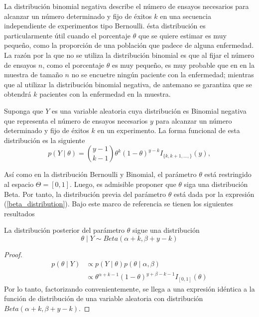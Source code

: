 \documentclass[10pt,openright]{book}\usepackage[]{graphicx}\usepackage[]{color}
\begin{document}
    La distribuci\'on binomial negativa describe el n\'umero de ensayos necesarios para alcanzar un n\'umero determinado y fijo de \'exitos $k$ en una secuencia independiente de experimentos tipo Bernoulli. \'esta distribuci\'on es particularmente \'util cuando el porcentaje $\theta$ que se quiere estimar es muy peque\~no, como la proporci\'on de una poblaci\'on que padece de alguna enfermedad. La raz\'on por la que no se utiliza la distribuci\'on binomial es que al fijar el n\'umero de ensayos $n$, como el porcentaje $\theta$ es muy peque\~no, es muy probable que en en la muestra de tama\~no $n$ no se encuetre ning\'un paciente con la enfermedad; mientras que al utilizar la distribuci\'on binomial negativa, de antemano se garantiza que se obtendr\'a $k$ pacientes con la enfermedad en la muestra.
    
    Suponga que $Y$ es una variable aleatoria cuya distribuci\'on es Binomial negativa que representa el n\'umero de ensayos necesarios $y$ para alcanzar un n\'umero determinado y fijo de \'exitos $k$ en un experimento. La forma funcional de esta distribuci\'on es la siguiente
    \begin{equation}
    p(Y \mid \theta)=\binom{y-1}{k-1}\theta^k(1-\theta)^{y-k}I_{\{k,k+1,\ldots,\}}(y),
    \end{equation}
    
    As\'i como en la distribuci\'on Bernoulli y Binomial, el par\'ametro $\theta$ est\'a restringido al espacio $\Theta=[0,1]$. Luego, es admisible proponer que $\theta$ siga una distribuci\'on Beta. Por tanto, la distribuci\'on previa del par\'ametro $\theta$ est\'a dada por la expresi\'on (\ref{beta_distribution}). Bajo este marco de referencia se tienen los siguientes resultados
    
    \begin{Res}
    La distribuci\'on posterior del par\'ametro $\theta$ sigue una distribuci\'on
    \begin{equation*}
    \theta \mid Y \sim Beta(\alpha+k,\beta+y-k)
    \end{equation*}
    \end{Res}
    
    \begin{proof}
    \begin{align*}
    p(\theta \mid Y)&\propto p(Y \mid \theta)p(\theta \mid \alpha,\beta)\\
    &\propto \theta^{\alpha+k-1} (1-\theta)^{y+\beta-k-1}I_{[0,1]}(\theta)
    \end{align*}
    Por lo tanto, factorizando convenientemente, se llega a una expresi\'on id\'entica a la funci\'on de distribuci\'on de una variable aleatoria con distribuci\'on $Beta(\alpha+k,\beta+y-k)$.
    \end{proof}
    
\end{document}
